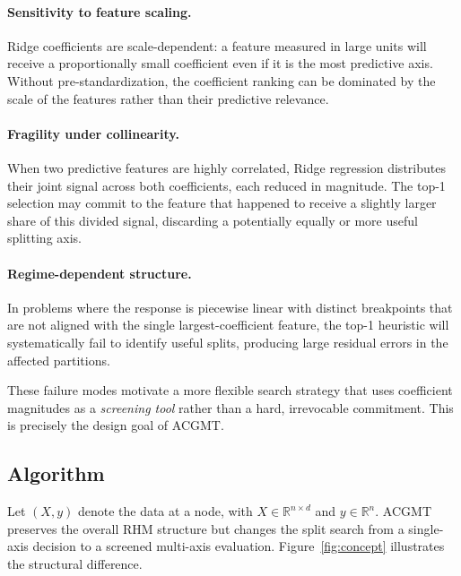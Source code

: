 \documentclass[11pt,a4paper]{article}
\begin{document}
\paragraph{Sensitivity to feature scaling.} Ridge coefficients are scale-dependent: a feature measured in large units will receive a proportionally small coefficient even if it is the most predictive axis. Without pre-standardization, the coefficient ranking can be dominated by the scale of the features rather than their predictive relevance.

\paragraph{Fragility under collinearity.} When two predictive features are highly correlated, Ridge regression distributes their joint signal across both coefficients, each reduced in magnitude. The top-1 selection may commit to the feature that happened to receive a slightly larger share of this divided signal, discarding a potentially equally or more useful splitting axis.

\paragraph{Regime-dependent structure.} In problems where the response is piecewise linear with distinct breakpoints that are not aligned with the single largest-coefficient feature, the top-1 heuristic will systematically fail to identify useful splits, producing large residual errors in the affected partitions.

These failure modes motivate a more flexible search strategy that uses coefficient magnitudes as a \emph{screening tool} rather than a hard, irrevocable commitment. This is precisely the design goal of ACGMT.

\subsection{Algorithm}

Let $(X, y)$ denote the data at a node, with $X \in \mathbb{R}^{n \times d}$ and $y \in \mathbb{R}^n$. ACGMT preserves the overall RHM structure but changes the split search from a single-axis decision to a screened multi-axis evaluation. Figure~\ref{fig:concept} illustrates the structural difference.
\end{document}
